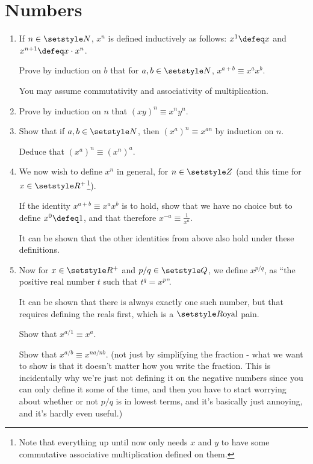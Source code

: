 \section{Numbers}

\begin{enumerate}
 \item
  If \(n \in \Naturals\), \(x^n\) is defined inductively as follows:
  \(x^1 \defeq x\) and \(x^{n + 1} \defeq x \cdot x^n\).

  Prove by induction on \(b\) that for \(a, b \in \Naturals\),
  \(x^{a + b} \equiv x^a x^b\).

  You may assume commutativity and associativity of multiplication.
 \item
  Prove by induction on \(n\) that \((xy)^n \equiv x^n y^n\).
 \item
  Show that if \(a, b \in \Naturals\), then
  \((x^a)^n \equiv x^{an}\) by induction on \(n\).

  Deduce that \((x^a)^n \equiv (x^n)^a\).
 \item
  We now wish to define \(x^n\) in general, for \(n \in \Integers\) (and this
  time for \(x \in \Reals^+\)\footnote{
   Note that everything up until now only needs \(x\) and \(y\) to have some
   commutative associative multiplication defined on them.
  }).

  If the identity \(x^{a + b} \equiv x^a x^b\) is to hold, show that
  we have no choice but to define \(x^0 \defeq 1\), and that therefore
  \(x^{-a} \equiv \frac 1{x^a}\).

  It can be shown that the other identities from above also hold under these
  definitions.
 \item
  Now for \(x \in \Reals^+\) and \(p/q \in \Rationals\), we define \(x^{p/q}\),
  as ``the positive real number \(t\) such that \(t^q = x^p\)''.

  It can be shown that there is always exactly one such number, but that
  requires defining the reals first, which is a \(\Reals\text{oyal}\) pain.

  Show that \(x^{a / 1} \equiv x^a\).

  Show that \(x^{a / b} \equiv x^{na/nb}\). (not just by simplifying the
  fraction - what we want to show is that it doesn't matter how you write the
  fraction. This is incidentally why we're just not defining it on the negative
  numbers since you can only define it some of the time, and then you have to
  start worrying about whether or not \(p/q\) is in lowest terms, and it's
  basically just annoying, and it's hardly even useful.)


\end{enumerate}
